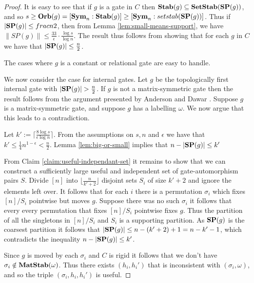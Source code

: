 \documentclass[12pt]{report}
\newcommand{\stab}{\text{\textbf{Stab}}}
\newcommand{\setstab}{\text{\textbf{SetStab}}}
\newcommand{\matstab}{\text{\textbf{MatStab}}}
\newcommand{\sym}{\text{\textbf{Sym}}}
\newcommand{\orb}{\text{\textbf{Orb}}}
\newcommand{\SP}{\text{\textbf{SP}}}
\begin{document}
\begin{proof}
  It is easy to see that if $g$ is a gate in $C$ then $\stab (g) \subseteq
  \setstab(\SP(g))$, and so $s \geq \orb(g) = [\sym_n : \stab(g)] \geq [\sym_n :
  setstab(\SP(g))]$. Thus if $\vert \SP(g) \vert \leq frac{n}{2}$, then from
  Lemma \ref{lem:small-means-support}, we have $\| SP (g) \| \leq
  \frac{33}{\epsilon} \cdot \frac{\log s} {\log n}$. The result thus follows
  from showing that for each $g$ in $C$ we have that $\vert \SP (g) \vert \leq
  \frac{n}{2}$.
  
  The cases where $g$ is a constant or relational gate are easy to handle.

  We now consider the case for internal gates. Let $g$ be the topologically
  first internal gate with $\vert \SP(g) \vert > \frac{n}{2}$. If $g$ is not a
  matrix-symmetric gate then the result follows from the argument presented by
  Anderson and Dawar \cite{}. Suppose $g$ is a matrix-symmetric gate, and
  suppose $g$ has a labelling $\omega$. We now argue that this leads to a
  contradiction.

  Let $k' := \lceil \frac{8 \log s}{\epsilon \log n} \rceil$. From the
  assumptions on $s, n$ and $\epsilon$ we have that $k' \leq
  \frac{1}{4}n^{1-\epsilon} < \frac{n}{2}$. Lemma \ref{lem:big-or-small} implies
  that $n - \vert \SP(g) \vert \leq k'$
  
  From Claim \ref{claim:useful-independant-set} it remains to show that we can
  construct a sufficiently large useful and independent set of gate-automorphism
  pairs $S$. Divide $[n]$ into $\lfloor \frac{n}{k' + 2} \rfloor$ disjoint sets
  $S_i$ of size $k' + 2$ and ignore the elements left over. It follows that for
  each $i$ there is a permutation $\sigma_i$ which fixes $[n] / S_i$ pointwise
  but moves $g$. Suppose there was no such $\sigma_i$ it follows that every
  every permutation that fixes $[n]/S_i$ pointwise fixes $g$. Thus the partition
  of all the singletons in $[n]/S_i$ and $S_i$ is a supporting partition. As
  $\SP(g)$ is the coarsest partition it follows that $\vert \SP(g) \vert \leq n
  - (k'+2) + 1 = n - k' - 1$, which contradicts the inequality $n - \vert \SP(g)
  \vert \leq k'$.

  Since $g$ is moved by each $\sigma_i$ and $C$ is rigid it follows that we
  don't have $\sigma_i \notin \matstab(\omega)$. Thus there exists $(h_i, h_i')$
  that is inconsistent with $(\sigma_i, \omega)$, and so the triple $(\sigma_i,
  h_i, h_i')$ is useful.


\end{proof}
\end{document}
